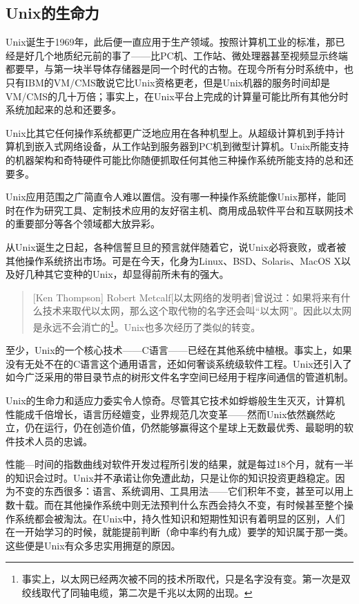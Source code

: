 \documentclass[11pt,oneside]{book}
\begin{document}
\begin{common-format}
\section{Unix的生命力}
Unix诞生于1969年，此后便一直应用于生产领域。按照计算机工业的标准，那已经是好几个地质纪元前的事了——比PC机、工作站、微处理器甚至视频显示终端都要早，与第一块半导体存储器是同一个时代的古物。在现今所有分时系统中，也只有IBM的VM/CMS敢说它比Unix资格更老，但是Unix机器的服务时间却是VM/CMS的几十万倍；事实上，在Unix平台上完成的计算量可能比所有其他分时系统加起来的总和还要多。

Unix比其它任何操作系统都更广泛地应用在各种机型上。从超级计算机到手持计算机到嵌入式网络设备，从工作站到服务器到PC机到微型计算机。Unix所能支持的机器架构和奇特硬件可能比你随便抓取任何其他三种操作系统所能支持的总和还要多。

Unix应用范围之广简直令人难以置信。没有哪一种操作系统能像Unix那样，能同时在作为研究工具、定制技术应用的友好宿主机、商用成品软件平台和互联网技术的重要部分等各个领域都大放异彩。

从Unix诞生之日起，各种信誓旦旦的预言就伴随着它，说Unix必将衰败，或者被其他操作系统挤出市场。可是在今天，化身为Linux、BSD、Solaris、MacOS X以及好几种其它变种的Unix，却显得前所未有的强大。
\begin{quote}[Ken Thompson]
Robert Metcalf[以太网络的发明者]曾说过：如果将来有什么技术来取代以太网，那么这个取代物的名字还会叫“以太网”。因此以太网是永远不会消亡的\footnote{事实上，以太网已经两次被不同的技术所取代，只是名字没有变。第一次是双绞线取代了同轴电缆，第二次是千兆以太网的出现。}。Unix也多次经历了类似的转变。
\end{quote}

至少，Unix的一个核心技术——C语言——已经在其他系统中植根。事实上，如果没有无处不在的C语言这个通用语言，还如何奢谈系统级软件工程。Unix还引入了如今广泛采用的带目录节点的树形文件名字空间已经用于程序间通信的管道机制。

Unix的生命力和适应力委实令人惊奇。尽管其它技术如蜉蝣般生生灭灭，计算机性能成千倍增长，语言历经嬗变，业界规范几次变革——然而Unix依然巍然屹立，仍在运行，仍在创造价值，仍然能够赢得这个星球上无数最优秀、最聪明的软件技术人员的忠诚。

性能—时间的指数曲线对软件开发过程所引发的结果，就是每过18个月，就有一半的知识会过时。Unix并不承诺让你免遭此劫，只是让你的知识投资更趋稳定。因为不变的东西很多：语言、系统调用、工具用法——它们积年不变，甚至可以用上数十载。而在其他操作系统中则无法预判什么东西会持久不变，有时候甚至整个操作系统都会被淘汰。在Unix中，持久性知识和短期性知识有着明显的区别，人们在一开始学习的时候，就能提前判断（命中率约有九成）要学的知识属于那一类。这些便是Unix有众多忠实用拥趸的原因。


\end{common-format}
\end{document}

